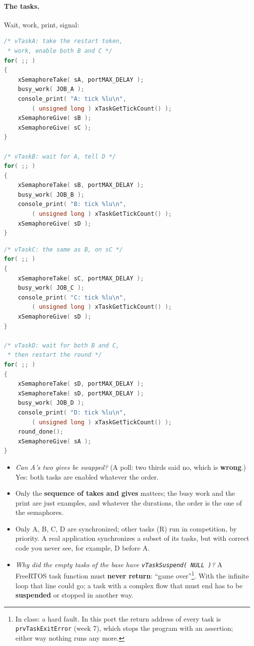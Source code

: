 \paragraph{The tasks.} Wait, work, print, signal:
\par\noindent\begin{minipage}[t]{0.49\textwidth}
\begin{lstlisting}[language=C, showstringspaces=false, basicstyle=\ttfamily\scriptsize]
/* vTaskA: take the restart token,
 * work, enable both B and C */
for( ;; )
{
    xSemaphoreTake( sA, portMAX_DELAY );
    busy_work( JOB_A );
    console_print( "A: tick %lu\n",
        ( unsigned long ) xTaskGetTickCount() );
    xSemaphoreGive( sB );
    xSemaphoreGive( sC );
}

/* vTaskB: wait for A, tell D */
for( ;; )
{
    xSemaphoreTake( sB, portMAX_DELAY );
    busy_work( JOB_B );
    console_print( "B: tick %lu\n",
        ( unsigned long ) xTaskGetTickCount() );
    xSemaphoreGive( sD );
}
\end{lstlisting}
\end{minipage}\hfill
\begin{minipage}[t]{0.49\textwidth}
\begin{lstlisting}[language=C, showstringspaces=false, basicstyle=\ttfamily\scriptsize]
/* vTaskC: the same as B, on sC */
for( ;; )
{
    xSemaphoreTake( sC, portMAX_DELAY );
    busy_work( JOB_C );
    console_print( "C: tick %lu\n",
        ( unsigned long ) xTaskGetTickCount() );
    xSemaphoreGive( sD );
}

/* vTaskD: wait for both B and C,
 * then restart the round */
for( ;; )
{
    xSemaphoreTake( sD, portMAX_DELAY );
    xSemaphoreTake( sD, portMAX_DELAY );
    busy_work( JOB_D );
    console_print( "D: tick %lu\n",
        ( unsigned long ) xTaskGetTickCount() );
    round_done();
    xSemaphoreGive( sA );
}
\end{lstlisting}
\end{minipage}
\begin{itemize}
    \item \emph{Can A's two gives be swapped?} (A poll: two thirds said no, which is \textbf{wrong}.) Yes: both tasks are enabled whatever the order.
    \item Only the \textbf{sequence of takes and gives} matters; the busy work and the print are just examples, and whatever the durations, the order is the one of the semaphores.
    \item Only A, B, C, D are synchronized; other tasks (R) run in competition, by priority. A real application synchronizes a subset of its tasks, but with correct code you never see, for example, D before A.
    \item \emph{Why did the empty tasks of the base have \texttt{vTaskSuspend( NULL )}?} A FreeRTOS task function must \textbf{never return}: ``game over''\footnote{In class: a hard fault. In this port the return address of every task is \texttt{prvTaskExitError} (week 7), which stops the program with an assertion; either way nothing runs any more.}. With the infinite loop that line could go; a task with a complex flow that must end has to be \textbf{suspended} or stopped in another way.
\end{itemize}

